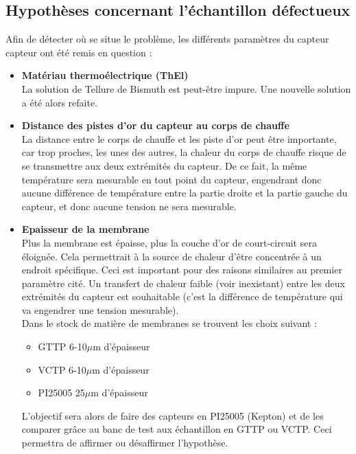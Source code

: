 \subsection{Hypothèses concernant l'échantillon défectueux}
Afin de détecter où se situe le problème, les différents paramètres du capteur \gls{capteur} ont été remis en question :
\begin{itemize}
    \item \textbf{Matériau thermoélectrique (ThEl)}\\
          La solution de Tellure de Bismuth est peut-être impure. Une nouvelle solution a été alors refaite.

    \item \textbf{Distance des pistes d'or du capteur au corps de chauffe}\\
          La distance entre le corps de chauffe et les piste d'or peut être importante, car trop proches, les unes des autres, la chaleur du corps
          de chauffe risque de se transmettre aux deux extrémités du capteur. De ce fait, la même température sera mesurable en tout point du
          capteur, engendrant donc aucune différence de température entre la partie droite et la partie gauche du \gls{capteur}, et donc aucune
          tension ne sera mesurable.\\

    \item \textbf{Epaisseur de la membrane} \\
          Plus la membrane est épaisse, plus la couche d'or de court-circuit sera éloignée. Cela permettrait à la source de chaleur d'être concentrée
          à un endroit spécifique. Ceci est important pour des raisons similaires au premier paramètre cité. Un transfert de chaleur faible (voir
          inexistant) entre les deux extrémités du \gls{capteur} est souhaitable (c'est la différence de température qui va engendrer une tension
          mesurable). \\

          Dans le stock de matière de membranes se trouvent les choix suivant :
          \begin{itemize}
              \item GTTP 6-10$\mu$m d'épaisseur
              \item VCTP 6-10$\mu$m d'épaisseur
              \item PI25005 25$\mu$m d'épaisseur
          \end{itemize}
          L'objectif sera alors de faire des capteurs en PI25005 (Kepton) et de les comparer grâce au banc de test aux échantillon en GTTP ou VCTP.
          Ceci permettra de affirmer ou désaffirmer l'hypothèse.\\


\end{itemize}

